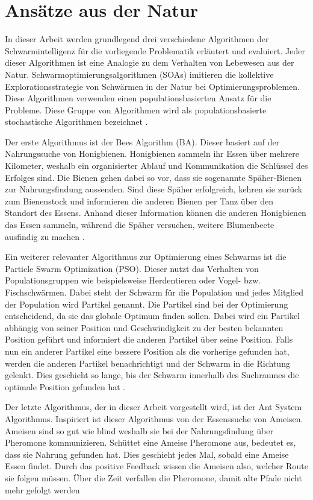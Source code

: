 \section{Ansätze aus der Natur}
In dieser Arbeit werden grundlegend drei verschiedene Algorithmen der Schwarmintelligenz für die vorliegende Problematik erläutert und evaluiert. Jeder dieser Algorithmen ist eine Analogie zu dem Verhalten von Lebewesen aus der Natur. Schwarmoptimierungsalgorithmen (SOAs) imitieren die kollektive Explorationsstrategie von Schwärmen in der Natur bei Optimierungsproblemen. Diese Algorithmen verwenden einen populationsbasierten Ansatz für die Probleme. Diese Gruppe von Algorithmen wird als populationsbasierte stochastische Algorithmen bezeichnet \cite{Yuce2013}.

Der erste Algorithmus ist der Bees Algorithm (BA). Dieser basiert auf der Nahrungssuche von Honigbienen. Honigbienen sammeln ihr Essen über mehrere Kilometer, weshalb ein organisierter Ablauf und Kommunikation die Schlüssel des Erfolges sind. Die Bienen gehen dabei so vor, dass sie sogenannte Späher-Bienen zur Nahrungsfindung aussenden. Sind diese Späher erfolgreich, kehren sie zurück zum Bienenstock und informieren die anderen Bienen per Tanz über den Standort des Essens. Anhand dieser Information können die anderen Honigbienen das Essen sammeln, während die Späher versuchen, weitere Blumenbeete ausfindig zu machen \cite{Brownlee2011}.

Ein weiterer relevanter Algorithmus zur Optimierung eines Schwarms ist die Particle Swarm Optimization (PSO). Dieser nutzt das Verhalten von Populationsgruppen wie beispielsweise Herdentieren oder  Vogel- bzw. Fischschwärmen. Dabei steht der Schwarm für die Population und jedes Mitglied der Population wird Partikel genannt. Die Partikel sind bei der Optimierung entscheidend, da sie das globale Optimum finden sollen.  Dabei wird ein Partikel abhängig von seiner Position und Geschwindigkeit zu der besten bekannten Position geführt und informiert die anderen Partikel über seine Position. Falls nun ein anderer Partikel eine bessere Position als die vorherige gefunden hat, werden die anderen Partikel benachrichtigt und der Schwarm in die Richtung gelenkt. Dies geschieht so lange, bis der Schwarm innerhalb des Suchraumes die optimale Position gefunden hat \cite{Brownlee2011}. 

Der letzte Algorithmus, der in dieser Arbeit vorgestellt wird, ist der Ant System Algorithmus. Inspiriert ist dieser Algorithmus von der Essenssuche von Ameisen. Ameisen sind so gut wie blind weshalb sie bei der Nahrungsfindung über Pheromone kommunizieren. Schüttet eine Ameise Pheromone aus, bedeutet es, dass sie Nahrung gefunden hat. Dies geschieht jedes Mal, sobald eine Ameise Essen findet. Durch das positive Feedback wissen die Ameisen also, welcher Route sie folgen müssen. Über die Zeit verfallen die Pheromone, damit alte Pfade nicht mehr gefolgt werden \cite{Brownlee2011}

